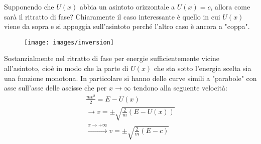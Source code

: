 \documentclass[Main.tex]{subfiles}
\begin{document}
\newpage
{}

\begin{appendic}[Inversione]
Supponendo che $U(x)$ abbia un asintoto orizzontale a $U(x)=c$, allora come sarà il ritratto di fase? Chiaramente il caso interessante è quello in cui $U(x)$ viene da sopra e si appoggia sull'asintoto perché l'altro caso è ancora a "coppa".
\begin{figure}[H]
    \centering
    \texttt{[image: images/inversion]}
\end{figure}
Sostanzialmente nel ritratto di fase per energie sufficientemente vicine all'asintoto, cioè in modo che la parte di $U(x)$ che sta sotto l'energia scelta sia una funzione monotona. In particolare si hanno delle curve simili a "parabole" con asse sull'asse delle ascisse che per $x \rightarrow \infty$ tendono alla seguente velocità:
\begin{gather}
  \frac{mv^2}{2}=E-U(x)  \\\longrightarrow v= \pm \sqrt{\frac{2}{m} (E-U(x))} \\ \xrightarrow{x \rightarrow + \infty} v = \pm \sqrt{ \frac{2}{m}(E-c)}
\end{gather}
\end{appendic}
\end{document}
